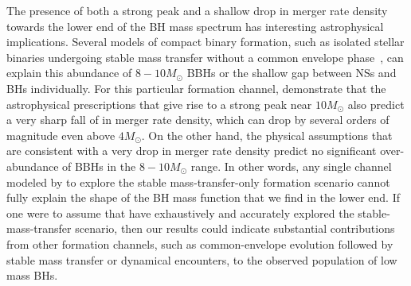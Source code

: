 \documentclass[modern]{aastex631}
\newcommand{\todo}[1]{\textcolor{red}{TODO: #1}}
\begin{document}
The presence of both a strong peak and a shallow drop in merger rate density towards the lower end of the BH mass spectrum has interesting astrophysical implications. Several models of compact binary formation, such as isolated stellar binaries undergoing stable
mass transfer without a common envelope phase~\citep{vanSon:2022myr}, can explain this abundance of $8-10M_{\odot}$ BBHs or the shallow gap between NSs and BHs individually. For this particular formation channel, \cite{vanSon:2022myr} demonstrate that the astrophysical prescriptions that give rise to a strong peak near $10M_{\odot}$ also predict a very sharp fall of in merger rate density, which can drop by several orders of magnitude even above $4M_{\odot}$. On the other hand, the physical assumptions that are consistent with a very drop in merger rate density predict no significant over-abundance of BBHs in the $8-10M_{\odot}$ range. In other words, any single channel modeled by  \cite{vanSon:2022myr} to explore the stable mass-transfer-only formation scenario cannot fully explain the shape of the BH mass function that we find in the lower end. If one were to assume that \cite{vanSon:2022myr} have exhaustively and accurately explored the stable-mass-transfer scenario, then our results could indicate substantial contributions from other formation channels, such as common-envelope evolution followed by stable mass transfer or dynamical encounters, to the observed population of low mass BHs.

\end{document}
